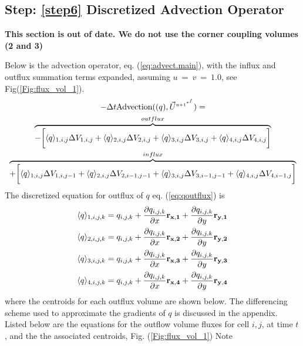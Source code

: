 \documentclass[fleqn]{article}
\begin{document}
{\subsection{Step: \ref{step6}  \textsf{Discretized Advection Operator}}
\textbf{ This section is out of date.  We do not use the corner coupling volumes (2 and 3)}

Below is the advection operator, eq. (\ref{eq:advect.main}), with the
influx and outflux summation terms expanded, assuming $u~=~v~=~ 1.0$,
see Fig(\ref{Fig:flux_vol_1}).
%
%
\begin{multline}
    -\delt\text{Advection}( (q), \ustar) = \\
    \overbrace{- \biggl{[} 
    \langle{q}\rangle_{1,i,j} \Delta{V}_{1,i,j}  
+   \langle{q}\rangle_{2,i,j} \Delta{V_{2,i,j}}
+   \langle{q}\rangle_{3,i,j} \Delta{V_{3,i,j}}
+   \langle{q}\rangle_{4,i,j} \Delta{V_{4,i,j}} \biggr{]} }^{outflux}           \\
    \overbrace{+ \biggl{[} 
    \langle{q}\rangle_{1,i,j} \Delta{V}_{1,i,j-1}  
+   \langle{q}\rangle_{2,i,j} \Delta{V_{2,i-1,j-1}}
+   \langle{q}\rangle_{3,i,j} \Delta{V_{3,i-1,j-1}}
+   \langle{q}\rangle_{4,i,j} \Delta{V_{4,i-1,j}} \biggr{]} }^{influx}           \\
\end{multline}
%
%
The discretized equation for outflux of $q$ eq. (\ref{eq:qoutflux}) is \\
%
%
\begin{align}
    \langle{q}\rangle_{1,i,j,k} = q_{i,j,k} 
+   \pd{q_{i,j,k}}{x} \mathbf{r_{x,1}}
+   \pd{q_{i,j,k}}{y} \mathbf{r_{y,1}} \\
    \label{eq:discrete.qoutflux1}
    \langle{q}\rangle_{2,i,j,k} = q_{i,j,k} 
+   \pd{q_{i,j,k}}{x} \mathbf{r_{x,2}}
+   \pd{q_{i,j,k}}{y} \mathbf{r_{y,2}}  \\
    \label{eq:discrete.qoutflux2}
    \langle{q}\rangle_{3,i,j,k} = q_{i,j,k} 
+   \pd{q_{i,j,k}}{x} \mathbf{r_{x,3}}
+   \pd{q_{i,j,k}}{y} \mathbf{r_{y,3}}   \\
    \label{eq:discrete.qoutflux3}
    \langle{q}\rangle_{4,i,j,k} = q_{i,j,k} 
+   \pd{q_{i,j,k}}{x} \mathbf{r_{x,4}}
+   \pd{q_{i,j,k}}{y} \mathbf{r_{y,4}}   
\end{align}
    \label{eq:discrete.qoutflux4}
%
%
where the centroids for each outflux volume are shown below.  The differencing
scheme used to approximate the gradients of $q$ is discussed in the appendix.
%
%
Listed below are the equations for the outflow volume fluxes for cell $i,j$, at
time $t$, and the the associated centroids, Fig. (\ref{Fig:flux_vol_1})  Note
}
\end{document}
